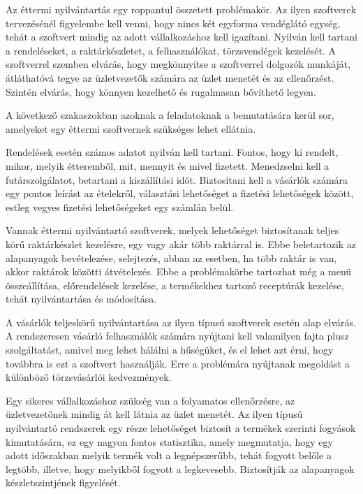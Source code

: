 
Az éttermi nyilvántartás egy roppantul összetett problémakör. Az ilyen szoftverek tervezésénél figyelembe kell venni, hogy nincs két egyforma vendéglátó egység, tehát a szoftvert mindig az adott vállalkozáshoz kell igazítani. Nyilván kell tartani a rendeléseket, a raktárkészletet, a felhasználókat, törzsvendégek kezelését. A szoftverrel szemben elvárás, hogy megkönnyítse a szoftverrel dolgozók munkáját, átláthatóvá tegye az üzletvezetők számára az üzlet menetét és az ellenőrzést. Szintén elvárás, hogy könnyen kezelhető és rugalmasan bővíthető legyen.


A következő szakaszokban azoknak a feladatoknak a bemutatására kerül sor, amelyeket egy éttermi szoftvernek szükséges lehet ellátnia.


Rendelések esetén számos adatot nyilván kell tartani. Fontos, hogy ki rendelt, mikor, melyik étteremből, mit, mennyit és mivel fizetett. Menedzselni kell a futárszolgálatot, betartani a kiszállítási időt. Biztosítani kell a vásárlók számára egy pontos leírást az ételekről, választási lehetőséget a fizetési lehetőségek között, estleg vegyes fizetési lehetőségeket egy számlán belül.


Vannak éttermi nyilvántartó szoftverek, melyek lehetőséget biztosítanak teljes körű raktárkészlet kezelésre, egy vagy akár több raktárral is. Ebbe beletartozik az alapanyagok bevételezése, selejtezés, abban az esetben, ha több raktár is van, akkor raktárok közötti átvételezés.
Ebbe a problémakörbe tartozhat még a menü összeállítása, előrendelések kezelése, a termékekhez tartozó receptúrák kezelése, tehát nyilvántartása és módosítása.


A vásárlók teljeskörű nyilvántartása az ilyen típusú szoftverek esetén alap elvárás. A rendszeresen vásárló felhasználók számára nyújtani kell valamilyen fajta plusz szolgáltatást, amivel meg lehet hálálni a hűségüket, és el lehet azt érni, hogy továbbra is ezt a szoftvert használják. Erre a problémára nyújtanak megoldást a különböző törzsvásárlói kedvezmények.


Egy sikeres vállalkozáshoz szükség van a folyamatos ellenőrzésre, az üzletvezetőnek mindig át kell látnia az üzlet menetét. Az ilyen típusú nyilvántartó rendszerek egy része lehetőséget biztosít a termékek szerinti fogyások kimutatására, ez egy nagyon fontos statisztika, amely megmutatja, hogy egy adott időszakban melyik termék volt a legnépszerűbb, tehát fogyott belőle a legtöbb, illetve, hogy melyikből fogyott a legkevesebb. Biztosítják az alapanyagok készletszintjének figyelését.

